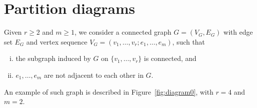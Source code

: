 \documentclass[12pt]{article}
\numberwithin{equation}{section}
\begin{document}
\section{Partition diagrams} 
\label{diagramrepresentation}
\noindent 
Given $r\geq 2$ and $m\geq 1$, we 
consider a connected graph $G=(V_G,E_G)$ with edge set $E_G$ and
vertex sequence 
$V_G=(v_1, \ldots ,v_r; e_1,\ldots , e_m)$, such that
\begin{enumerate}[i)]
\item the subgraph induced by $G$ on $\{v_1, \ldots ,v_r\}$ is connected, and 
\item $e_1, \ldots ,e_m$ are not adjacent to each other in $G$. 
\end{enumerate}
\noindent
 An example of such graph is described in Figure~\ref{fig:diagram0}, 
 with $r=4$ and $m=2$. 
\end{document}
